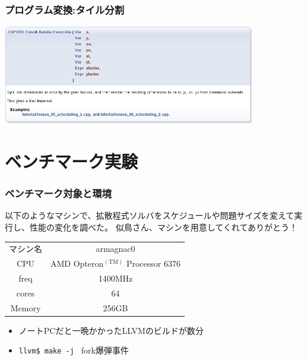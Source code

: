 \documentclass[dvipdfmx,cjk]{beamer}
\begin{document}
\begin{frame}\frametitle{プログラム変換:タイル分割}
\begin{center}\includegraphics[width=11cm]{figure/doc/schedule-tile.png}\end{center}\end{frame}



\section{ベンチマーク実験}
\begin{frame}\frametitle{ベンチマーク対象と環境}

以下のようなマシンで、拡散程式ソルバをスケジュールや問題サイズを変えて実行し、性能の変化を調べた。
似鳥さん、マシンを用意してくれてありがとう！

\begin{center}
  \begin{tabular}{|c|c|}
    \hline
    マシン名 & armagnac0\\
    CPU & AMD Opteron${}^\mathrm{(TM)}$ Processor 6376 \\
    freq & 1400MHz \\
    cores & 64 \\
    Memory & 256GB \\
    \hline
  \end{tabular}
\end{center}

\begin{itemize}
\item ノートPCだと一晩かかったLLVMのビルドが数分
\item {\tt llvm\$ make -j } fork爆弾事件
\end{itemize}
\end{frame}
\end{document}
